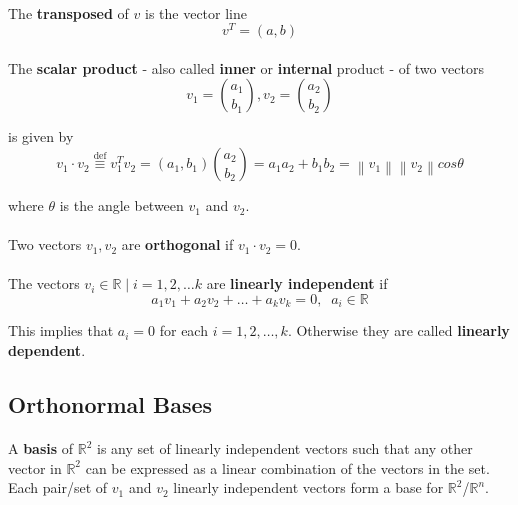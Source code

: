 \documentclass[a4paper,10pt]{article}
\newcommand\norm[1]{\left\lVert#1\right\rVert}
\begin{document}
\paragraph{} The \textbf{transposed} of $v$ is the vector line
\begin{equation}
v^T = (a, b)
\label{eq:vectorTransposedInR2}
\end{equation}

\paragraph{} The \textbf{scalar product} - also called \textbf{inner} or \textbf{internal} product - of two vectors
\begin{equation*}
v_1 = \binom{a_1}{b_1}, v_2 = \binom{a_2}{b_2}
\end{equation*}

is given by 
\begin{equation}
v_1 \cdot v_2 \stackrel{\text{def}}{\equiv} v_1^Tv_2 = (a_1, b_1) \binom{a_2}{b_2} = a_1 a_2 + b_1 b_2 = \norm{v_1}\norm{v_2}cos{\theta}
\label{eq:vectorScalarProductInR2}
\end{equation}

where ${\theta}$ is the angle between $v_1$ and $v_2$.

\paragraph{} Two vectors $v_1, v_2$ are \textbf{orthogonal} if $v_1 \cdot v_2 = 0$.

\paragraph{} The vectors ${v_i \in {\mathbb{R}} \; | \; i = 1, 2,\ldots k}$ are \textbf{linearly independent} if
\begin{equation}
a_1v_1 + a_2v_2 + \ldots + a_kv_k = 0, \; \; a_i \in {\mathbb{R}}
\label{eq:vectorLinearIndipendentInR2}
\end{equation}

This implies that $a_i = 0$ for each $i = 1, 2, \ldots, k$. Otherwise they are called \textbf{linearly dependent}.

\subsection{Orthonormal Bases} 

\paragraph{} A \textbf{basis} of ${\mathbb{R}}^2$ is any set of linearly independent vectors such that any other vector in ${\mathbb{R}}^2$ can be expressed as a linear combination of the vectors in the set. Each pair/set of $v_1$ and $v_2$ linearly independent vectors form a base for ${\mathbb{R}}^2$/${\mathbb{R}}^n$.
\end{document}
